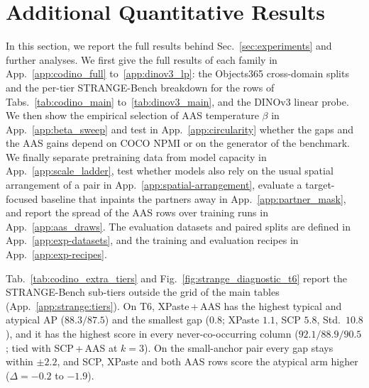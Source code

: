\section{Additional Quantitative Results}
\label{app:additional_results}
\suppressfloats[t]
\noindent In this section, we report the full results behind Sec.~\ref{sec:experiments} and further analyses. We first give the full results of each family in App.~\ref{app:codino_full} to~\ref{app:dinov3_lp}: the Objects365 cross-domain splits and the per-tier STRANGE-Bench breakdown for the rows of Tabs.~\ref{tab:codino_main} to~\ref{tab:dinov3_main}, and the DINOv3 linear probe. We then show the empirical selection of AAS temperature $\beta$ in App.~\ref{app:beta_sweep} and test in App.~\ref{app:circularity} whether the gaps and the AAS gains depend on COCO NPMI or on the generator of the benchmark. We finally separate pretraining data from model capacity in App.~\ref{app:scale_ladder}, test whether models also rely on the usual spatial arrangement of a pair in App.~\ref{app:spatial-arrangement}, evaluate a target-focused baseline that inpaints the partners away in App.~\ref{app:partner_mask}, and report the spread of the AAS rows over training runs in App.~\ref{app:aas_draws}. The evaluation datasets and paired splits are defined in App.~\ref{app:exp-datasets}, and the training and evaluation recipes in App.~\ref{app:exp-recipes}.



\noindent Tab.~\ref{tab:codino_extra_tiers} and Fig.~\ref{fig:strange_diagnostic_t6} report the STRANGE-Bench sub-tiers outside the grid of the main tables (App.~\ref{app:strange:tiers}).
On T6, XPaste\,+\,AAS has the highest typical and atypical AP ($88.3 / 87.5$) and the smallest gap ($0.8$; XPaste $1.1$, SCP $5.8$, Std.\ $10.8$), and it has the highest score in every never-co-occurring column ($92.1 / 88.9 / 90.5$; tied with SCP\,+\,AAS at $k = 3$). On the small-anchor pair every gap stays within $\pm 2.2$, and SCP, XPaste and both AAS rows score the atypical arm higher ($\Delta = -0.2$ to $-1.9$).
















